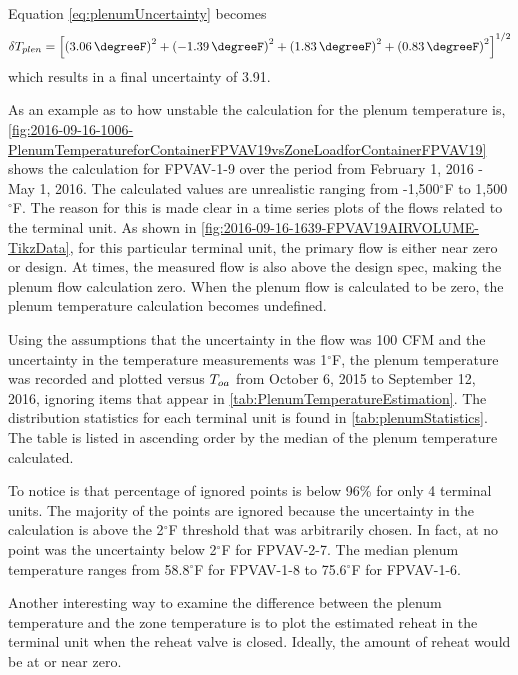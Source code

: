 Equation \ref{eq:plenumUncertainty} becomes
\begin{equation}\label{eq:plenumUncertainty2}
    \delta T_{plen} = \left[\left(  \SI{3.06}{\degreeF}  \right)^2  +\left( \SI{-1.39}{\degreeF}  \right)^2 +  \left( \SI{1.83}{\degreeF} \right)^2 + \left(\SI{0.83}{\degreeF}  \right)^2  \right]^{1/2}
\end{equation}
which results in a final uncertainty of \SI{3.91}{\degreeF}.

As an example as to how unstable the calculation for the plenum
temperature is, \figref{}
\ref{fig:2016-09-16-1006-PlenumTemperatureforContainerFPVAV19vsZoneLoadforContainerFPVAV19}
shows the calculation for FPVAV-1-9 over the period from February 1,
2016 - May 1, 2016. The calculated values are unrealistic ranging from
-1,500\(^\circ\)F to 1,500\(^\circ\)F. The reason for this is made clear
in a time series plots of the flows related to the terminal unit. As
shown in \figref{} \ref{fig:2016-09-16-1639-FPVAV19AIRVOLUME-TikzData},
for this particular terminal unit, the primary flow is either near zero
or design. At times, the measured flow is also above the design
spec, making the plenum flow calculation zero. When the plenum flow is
calculated to be zero, the plenum temperature calculation becomes
undefined.

Using the assumptions that the uncertainty in the flow was 100 CFM and
the uncertainty in the temperature measurements was 1\(^\circ\)F, the
plenum temperature was recorded and plotted versus \(T_{oa}\) from October
6, 2015 to September 12, 2016, ignoring items that appear in \tableref{}
\ref{tab:PlenumTemperatureEstimation}. The distribution statistics for
each terminal unit is found in \tableref{} \ref{tab:plenumStatistics}.
The table is listed in ascending order by the median of the plenum
temperature calculated.

To notice is that percentage of ignored points is below 96\% for only 4
terminal units.  The majority of the points are ignored because the
uncertainty in the calculation is above the 2\(^\circ\)F threshold that
was arbitrarily chosen.  In fact, at no point was the uncertainty below
2\(^\circ\)F for FPVAV-2-7.  The median plenum temperature ranges from
58.8\(^\circ\)F for FPVAV-1-8 to 75.6\(^\circ\)F for FPVAV-1-6.

Another interesting way to examine the difference between the plenum
temperature and the zone temperature is to plot the estimated reheat in
the terminal unit when the reheat valve is closed.  Ideally, the amount
of reheat would be at or near zero. 

